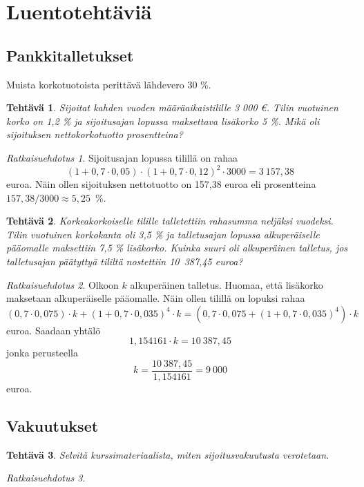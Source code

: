 \documentclass{article}\usepackage[]{graphicx}\usepackage[]{color}
\newtheorem{teht}{Tehtävä}
\theoremstyle{remark}
\newtheorem*{ratk}{Ratkaisuehdotus}
\begin{document}
\section*{Luentotehtäviä}

\subsection*{Pankkitalletukset}

Muista korkotuotoista perittävä lähdevero 30 \%.

\begin{teht} 
  Sijoitat kahden vuoden määräaikaistilille 3 000 \euro. Tilin vuotuinen korko on 1{,}2 \% ja sijoitusajan lopussa maksettava lisäkorko 5 \%. Mikä oli sijoituksen nettokorkotuotto prosentteina?
\end{teht}
\begin{ratk}

Sijoitusajan lopussa tilillä on rahaa 
\[
(1+0,7\cdot 0,05)\cdot(1+0,7\cdot 0,12)^2\cdot3000 = 3~157,38
\]
euroa. Näin ollen sijoituksen nettotuotto on 157,38 euroa eli prosentteina \(157,38/3000\approx 5,25\)~\%.
\end{ratk}

\begin{teht} Korkeakorkoiselle tilille talletettiin rahasumma neljäksi vuodeksi. Tilin vuotuinen korkokanta oli 3{,}5 \% ja talletusajan lopussa alkuperäiselle pääomalle maksettiin 7{,}5 \% lisäkorko. Kuinka suuri oli alkuperäinen talletus, jos talletusajan päätyttyä tililtä nostettiin 10~387{,}45 euroa?
\end{teht}
\begin{ratk}

  Olkoon \(k\) alkuperäinen talletus. Huomaa, että lisäkorko maksetaan alkuperäiselle pääomalle. Näin ollen tilillä on lopuksi rahaa
  \[
    (0,7\cdot0,075)\cdot k + (1+0,7\cdot0,035)^4\cdot k = (0,7\cdot0,075 + (1+0,7\cdot0,035)^4)\cdot k
  \]
euroa. Saadaan yhtälö
 \[
    1,154161\cdot k = 10~387,45
  \]
jonka perusteella
\[
  k = \frac{10~387,45}{1,154161} = 9~000
\]
euroa.
\end{ratk}

\subsection*{Vakuutukset}

\begin{teht} 
Selvitä kurssimateriaalista, miten sijoitusvakuutusta verotetaan. 

\end{teht}\begin{ratk}\end{ratk}
\end{document}
